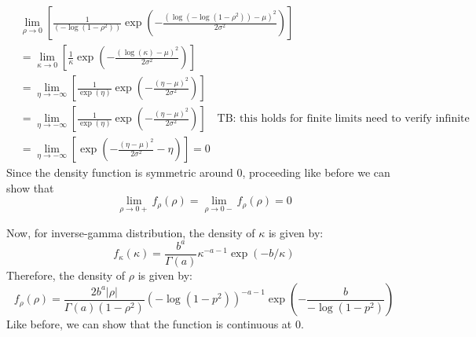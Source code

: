 \documentclass{amsart}
\begin{document}
\begin{align}
	&\lim_{\rho\to 0}\left[\frac{1}{(-\log(1-\rho^2))} 
	\exp\left(-\frac{(\log(-\log(1-\rho^2))-\mu)^2}{2\sigma^2}\right)\right]\\
	& = \lim_{\kappa\to 0}\left[\frac{1}{\kappa} 
	\exp\left(-\frac{(\log(\kappa)-\mu)^2}{2\sigma^2}\right)\right]\\
	& = \lim_{\eta\to -\infty}\left[\frac{1}{\exp(\eta)} 
	\exp\left(-\frac{(\eta-\mu)^2}{2\sigma^2}\right)\right]\\
	& = \lim_{\eta\to -\infty}\left[\frac{1}{\exp(\eta)} 
	\exp\left(-\frac{(\eta-\mu)^2}{2\sigma^2}\right)\right]\quad \text{TB: this holds for finite limits need to verify infinite}\\
	& = \lim_{\eta\to -\infty}\left[ 
	\exp\left(-\frac{(\eta-\mu)^2}{2\sigma^2}-\eta\right)\right] = 0
\end{align}
Since the density function is symmetric around 0, proceeding like before we can show that
\begin{equation}
	\lim_{\rho\to 0+}f_{\rho}(\rho) = \lim_{\rho\to 0-}f_{\rho}(\rho) = 0
\end{equation}

Now, for inverse-gamma distribution, the density of $\kappa$ is given by:
\begin{equation}
	f_{\kappa}(\kappa)= \frac{b^{a}}{\Gamma(a)}
	\kappa^{-a-1}\exp(-b/\kappa)
\end{equation}
Therefore, the density of $\rho$ is given by:
\begin{equation}
	f_{\rho}(\rho) = \frac{2b^{a}|\rho|}{\Gamma(a)(1-\rho^2)}
	(-\log(1-p^2))^{-a-1}\exp\left(-\frac{b}{-\log(1-p^2)}\right)
\end{equation}
Like before, we can show that the function is continuous at 0.

\end{document}
